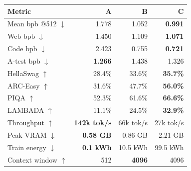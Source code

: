 \begin{tabular}{lrrr}
\toprule
Metric & A & B & C \\
\midrule
Mean bpb @512 $\downarrow$ & 1.778 & 1.052 & \textbf{0.991} \\
Web bpb $\downarrow$ & 1.450 & 1.109 & \textbf{1.071} \\
Code bpb $\downarrow$ & 2.423 & 0.755 & \textbf{0.721} \\
A-test bpb $\downarrow$ & \textbf{1.266} & 1.438 & 1.326 \\
HellaSwag $\uparrow$ & 28.4\% & 33.6\% & \textbf{35.7\%} \\
ARC-Easy $\uparrow$ & 31.6\% & 47.7\% & \textbf{56.0\%} \\
PIQA $\uparrow$ & 52.3\% & 61.6\% & \textbf{66.6\%} \\
LAMBADA $\uparrow$ & 11.1\% & 24.5\% & \textbf{32.9\%} \\
Throughput $\uparrow$ & \textbf{142k tok/s} & 66k tok/s & 27k tok/s \\
Peak VRAM $\downarrow$ & \textbf{0.58 GB} & 0.86 GB & 2.21 GB \\
Train energy $\downarrow$ & \textbf{0.1 kWh} & 10.5 kWh & 99.5 kWh \\
Context window $\uparrow$ & 512 & \textbf{4096} & 4096 \\
\bottomrule
\end{tabular}
